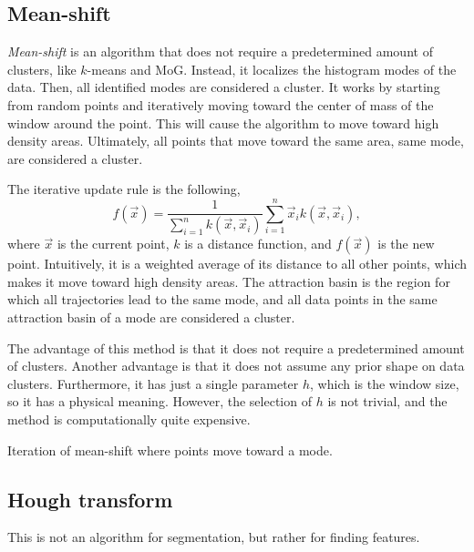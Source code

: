 \subsection{Mean-shift}

\textit{Mean-shift} is an algorithm that does not require a predetermined
amount of clusters, like $k$-means and MoG. Instead, it localizes the histogram
modes of the data. Then, all identified modes are considered a cluster. It
works by starting from random points and iteratively moving toward the center
of mass of the window around the point. This will cause the algorithm to move
toward high density areas. Ultimately, all points that move toward the same
area, \ie same mode, are considered a cluster.

The iterative update rule is the following, \[
    f(\vec{x}) = \frac{1}{\sum_{i=1}^n k(\vec{x},\vec{x}_i)} \sum_{i=1}^n \vec{x}_i k(\vec{x},\vec{x}_i),
\]
where $\vec{x}$ is the current point, $k$ is a distance function, and
$f(\vec{x})$ is the new point. Intuitively, it is a weighted average of its
distance to all other points, which makes it move toward high density areas.
The attraction basin is the region for which all trajectories lead to the same
mode, and all data points in the same attraction basin of a mode are considered
a cluster.

The advantage of this method is that it does not require a predetermined
amount of clusters. Another advantage is that it does not assume any prior
shape on data clusters. Furthermore, it has just a single parameter $h$,
which is the window size, so it has a physical meaning. However, the
selection of $h$ is not trivial, and the method is computationally quite
expensive.

\begin{marginfigure}
    \centering
    \caption{Iteration of mean-shift where points move toward a mode.}
    \label{fig:mean-shift}
\end{marginfigure}

\subsection{Hough transform}

\begin{remark}
    This is not an algorithm for segmentation, but rather for finding features.
\end{remark}

